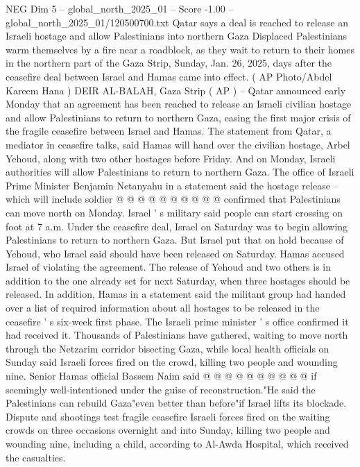 \begin{textsample}{NEG Dim 5 – global\_north\_2025\_01 – Score -1.00 – global\_north\_2025\_01/120500700.txt}  \label{ex:f5_neg_181}
Qatar says a deal is reached to release an Israeli hostage and allow Palestinians into northern Gaza Displaced Palestinians warm themselves by a fire near a roadblock, as they wait to return to their homes in the northern part of the Gaza Strip, Sunday, Jan. 26, 2025, days after the ceasefire deal between Israel and Hamas came into effect. ( AP Photo/Abdel Kareem Hana ) DEIR AL-BALAH, Gaza Strip ( AP ) -- Qatar announced early Monday that an agreement has been reached to release an Israeli civilian hostage and allow Palestinians to return to northern Gaza, easing the first major crisis of the fragile ceasefire between Israel and Hamas.
The statement from Qatar, a mediator in ceasefire talks, said Hamas will hand over the civilian hostage, Arbel Yehoud, along with two other hostages before Friday.
And on Monday, Israeli authorities will allow Palestinians to return to northern Gaza.
The office of Israeli Prime Minister Benjamin Netanyahu in a statement said the hostage release -- which will include soldier @ @ @ @ @ @ @ @ @ @ confirmed that Palestinians can move north on Monday.
Israel ' s military said people can start crossing on foot at 7 a.m.
Under the ceasefire deal, Israel on Saturday was to begin allowing Palestinians to return to northern Gaza.
But Israel put that on hold because of Yehoud, who Israel said should have been released on Saturday.
Hamas accused Israel of violating the agreement.
The release of Yehoud and two others is in addition to the one already set for next Saturday, when three hostages should be released.
In addition, Hamas in a statement said the militant group had handed over a list of required information about all hostages to be released in the ceasefire ' s six-week first phase.
The Israeli prime minister ' s office confirmed it had received it.
Thousands of Palestinians have gathered, waiting to move north through the Netzarim corridor bisecting Gaza, while local health officials on Sunday said Israeli forces fired on the crowd, killing two people and wounding nine.
Senior Hamas official Bassem Naim said @ @ @ @ @ @ @ @ @ @ if seemingly well-intentioned under the guise of reconstruction."He said the Palestinians can rebuild Gaza"even better than before"if Israel lifts its blockade.
Dispute and shootings test fragile ceasefire Israeli forces fired on the waiting crowds on three occasions overnight and into Sunday, killing two people and wounding nine, including a child, according to Al-Awda Hospital, which received the casualties.

\end{textsample}
